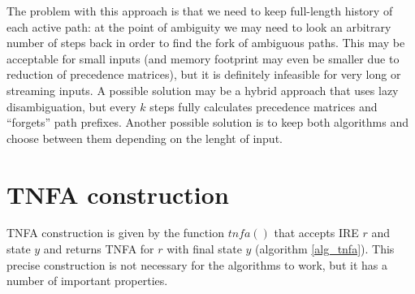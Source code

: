 \documentclass[AMA,STIX1COL]{WileyNJD-v2}
\begin{document}
The problem with this approach is that we need to keep full-length history of each active path:
at the point of ambiguity we may need to look an arbitrary number of steps back
in order to find the fork of ambiguous paths.
%
This may be acceptable for small inputs (and memory footprint may even be smaller due to reduction of precedence matrices),
but it is definitely infeasible for very long or streaming inputs.
%
A possible solution may be a hybrid approach that uses lazy disambiguation,
but every $k$ steps fully calculates precedence matrices and ``forgets'' path prefixes.
Another possible solution is to keep both algorithms and choose between them depending on the lenght of input.


\section{TNFA construction}\label{section_tnfa}

TNFA construction is given by the function $tn\!f\!a()$
that accepts IRE $r$ and state $y$ and returns TNFA for $r$ with final state $y$
(algorithm \ref{alg_tnfa}).
%
This precise construction is not necessary for the algorithms to work,
but it has a number of important properties.
\\[-0.5em]
\end{document}

